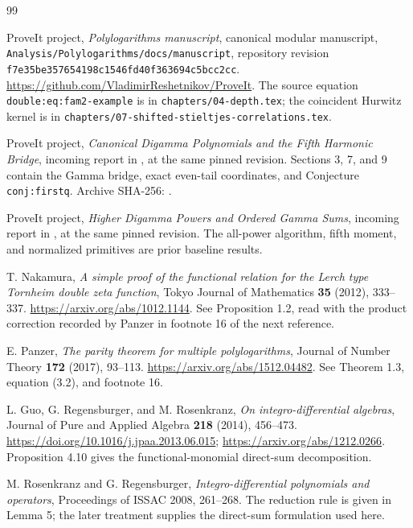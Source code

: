 \documentclass[11pt,a4paper]{article}
\numberwithin{equation}{section}
\theoremstyle{definition}
\theoremstyle{remark}
\begin{document}
\begin{thebibliography}{99}
\raggedright

ProveIt project,
\emph{Polylogarithms manuscript}, canonical modular manuscript,
\texttt{Analysis/Polylogarithms/docs/manuscript},
repository revision
\texttt{f7e35be357654198c1546fd40f363694c5bcc2cc}.
\url{https://github.com/VladimirReshetnikov/ProveIt}.
The source equation \texttt{double:eq:fam2-example} is in
\texttt{chapters/04-depth.tex}; the coincident Hurwitz kernel is in
\texttt{chapters/07-shifted-stieltjes-correlations.tex}.

ProveIt project,
\emph{Canonical Digamma Polynomials and the Fifth Harmonic Bridge},
incoming report in
,
at the same pinned revision.
Sections 3, 7, and 9 contain the Gamma bridge, exact even-tail
coordinates, and Conjecture \texttt{conj:firstq}.
Archive SHA-256:
.

ProveIt project,
\emph{Higher Digamma Powers and Ordered Gamma Sums},
incoming report in
,
at the same pinned revision.
The all-power algorithm, fifth moment, and normalized primitives are
prior baseline results.

T. Nakamura,
\emph{A simple proof of the functional relation for the Lerch type
Tornheim double zeta function},
Tokyo Journal of Mathematics \textbf{35} (2012), 333--337.
\url{https://arxiv.org/abs/1012.1144}.
See Proposition 1.2, read with the product correction recorded by
Panzer in footnote 16 of the next reference.

E. Panzer,
\emph{The parity theorem for multiple polylogarithms},
Journal of Number Theory \textbf{172} (2017), 93--113.
\url{https://arxiv.org/abs/1512.04482}.
See Theorem 1.3, equation (3.2), and footnote 16.

L. Guo, G. Regensburger, and M. Rosenkranz,
\emph{On integro-differential algebras},
Journal of Pure and Applied Algebra \textbf{218} (2014), 456--473.
\url{https://doi.org/10.1016/j.jpaa.2013.06.015};
\url{https://arxiv.org/abs/1212.0266}.
Proposition 4.10 gives the functional-monomial direct-sum decomposition.

M. Rosenkranz and G. Regensburger,
\emph{Integro-differential polynomials and operators},
Proceedings of ISSAC 2008, 261--268.
The reduction rule is given in Lemma 5; the later treatment
\cite{Guo2014} supplies the direct-sum formulation used here.


\end{thebibliography}
\end{document}
